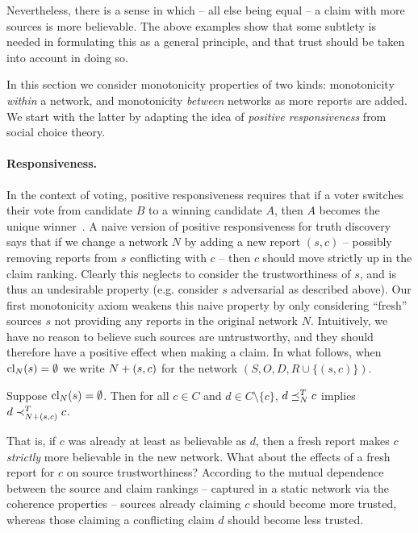 Nevertheless, there is a sense in which -- all else being equal -- a claim with
more sources is more believable. The above examples show that some subtlety is
needed in formulating this as a general principle, and that trust should be
taken into account in doing so.

In this section we consider monotonicity properties of two kinds: monotonicity
\emph{within} a network, and monotonicity \emph{between} networks as more
reports are added. We start with the latter by adapting the idea of
\emph{positive responsiveness} from social choice theory.

\paragraph{Responsiveness.}

In the context of voting, positive responsiveness requires that if
a voter switches their vote from candidate $B$ to a winning candidate $A$, then
$A$ becomes the unique winner~\cite{zwicker2016voting}.
%
A naive version of positive responsiveness for truth discovery says that if we
change a network $N$ by adding a new report $(s, c)$ -- possibly removing
reports from $s$ conflicting with $c$ -- then $c$ should move strictly up in
the claim ranking. Clearly this neglects to consider the trustworthiness of
$s$, and is thus an undesirable property (e.g. consider $s$ adversarial as
described above). Our first monotonicity axiom weakens this naive property by
only considering ``fresh'' sources $s$ not providing any reports in the original
network $N$. Intuitively, we have no reason to believe such sources are
untrustworthy, and they should therefore have a positive effect when making a
claim.
%
In what follows, when $\operatorname{cl}_N(s) = \emptyset$ we write ${N} + ({s}, {c})$
for the network $(S, O, D, R \cup \{(s, c)\})$.

\begin{axiom}[\freshposresp{}]
    Suppose $\operatorname{cl}_N(s) = \emptyset$. Then for all $c \in C$ and $d \in C
    \setminus \{c\}$, $d \preceq_N^T c$ implies $d \prec_{{N} + ({s}, {c})}^T c$.
\end{axiom}

That is, if $c$ was already at least as believable as $d$, then a fresh report
makes $c$ \emph{strictly} more believable in the new network.\footnotemark{}
%
What about the effects of a fresh report for $c$ on source trustworthiness?
According to the mutual dependence between the source and claim rankings --
captured in a static network via the coherence properties -- sources already
claiming $c$ should become more trusted, whereas those claiming a conflicting
claim $d$ should become less trusted.

